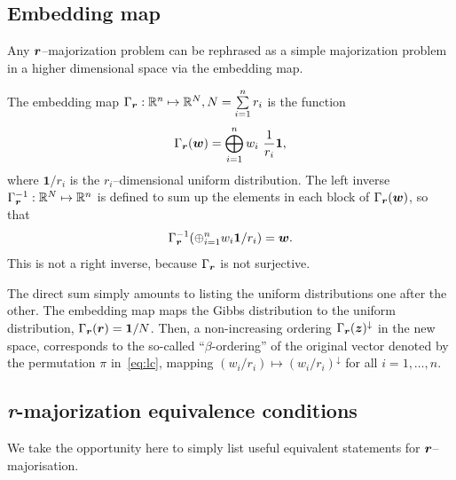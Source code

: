 \subsection{Embedding map}

Any $\boldsymbol{r}$--majorization problem can be rephrased as a simple majorization problem in a higher dimensional space via the embedding map.
\begin{definition}
  The embedding map $\Gamma_{\boldsymbol{r}}:\mathbb{R}^n \mapsto \mathbb{R}^N, N = \sum\limits_{i=1}^n r_i$ is the function
  \begin{equation}
    \Gamma_{\boldsymbol{r}}(\bm{w}) = \bigoplus_{i=1}^n w_i\  \frac{1}{r_i}\bm{1},
  \end{equation}
where $\bm{1}/r_i$ is the $r_i$--dimensional uniform distribution.
The left inverse $\Gamma_{\boldsymbol{r}}^{-1}: \mathbb{R}^N \mapsto \mathbb{R}^n$ is defined to sum up the elements in each block of $\Gamma_{\boldsymbol{r}}(\bm{w})$, so that
  \begin{equation}
     \Gamma_{\boldsymbol{r}}^{-1}(\oplus_{i=1}^n w_i \bm{1}/r_i) = \bm{w}.
  \end{equation}
  This is not a right inverse, because $\Gamma_{\boldsymbol{r}}$ is not surjective.
\end{definition}
The direct sum simply amounts to listing the uniform distributions one after the other.
The embedding map maps the Gibbs distribution to the uniform distribution, $\Gamma_{\boldsymbol{r}}(\boldsymbol{r}) = \bm{1}/N$.
Then, a non-increasing ordering $\Gamma_{\boldsymbol{r}}(\bm{z})^\downarrow$ in the new space, corresponds to the so-called ``$\beta$-ordering'' of the original vector denoted by the permutation $\pi$ in~\cref{eq:lc}, mapping $(w_i/r_i) \mapsto (w_i/r_i)^\downarrow$ for all $i=1,\dots,n$.

\subsection{\textit{r}-majorization equivalence conditions}

We take the opportunity here	 to simply list useful equivalent statements for $\boldsymbol{r}$--majorisation.

